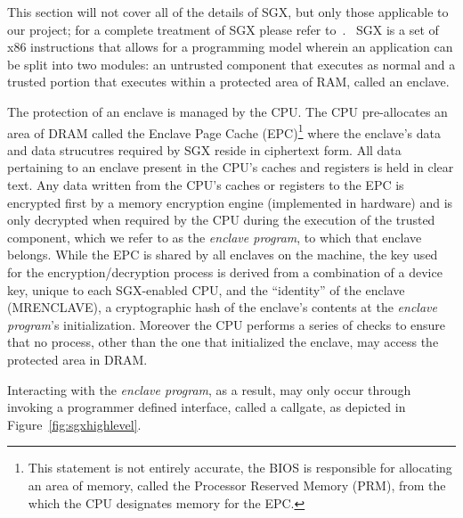 \documentclass[../main.tex]{subfiles}
\begin{document}
This section will not cover all of the details of SGX, but only those
applicable to our project; for a complete treatment of SGX please
refer to~\cite{IntelCorporation2010}. \Intel~SGX is a set of x86
instructions that allows for a programming model wherein an
application can be split into two modules: an untrusted component that
executes as normal and a trusted portion that executes within a
protected area of RAM, called an enclave.

The protection of an enclave is managed by the CPU. The CPU
pre-allocates an area of DRAM called the Enclave Page Cache
(EPC)\footnote{This statement is not entirely accurate, the BIOS is
  responsible for allocating an area of memory, called the Processor
  Reserved Memory (PRM), from the which the CPU designates memory for
  the EPC. } where the enclave's data and data strucutres required by
SGX reside in ciphertext form. All data pertaining to an enclave
present in the CPU's caches and registers is held in clear text. Any
data written from the CPU's caches or registers to the EPC is
encrypted first by a memory encryption engine (implemented in
hardware) and is only decrypted when required by the CPU during the
execution of the trusted component, which we refer to as the
\textit{enclave program}, to which that enclave belongs. While the EPC
is shared by all enclaves on the machine, the key used for the
encryption/decryption process is derived from a combination of a
device key, unique to each SGX-enabled CPU, and the ``identity'' of
the enclave (MRENCLAVE), a cryptographic hash of the enclave's
contents at the \textit{enclave program}'s initialization. Moreover
the CPU performs a series of checks to ensure that no process, other
than the one that initialized the enclave, may access the protected
area in DRAM.

Interacting with the \textit{enclave program}, as a result, may only
occur through invoking a programmer defined interface, called a
callgate, as depicted in Figure~\ref{fig:sgxhighlevel}.
\end{document}
